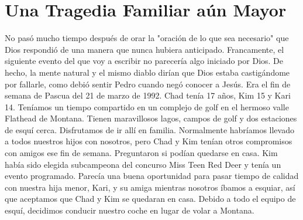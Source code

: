 \documentclass[twoside, 12pt]{book}
\begin{document}
 



\section{Una Tragedia Familiar aún Mayor}

No pasó mucho tiempo después de orar la "oración de lo que sea necesario" que Dios respondió de una manera que nunca hubiera anticipado. Francamente, el siguiente evento del que voy a escribir no parecería algo iniciado por Dios. De hecho, la mente natural y el mismo diablo dirían que Dios estaba castigándome por fallarle, como debió sentir Pedro cuando negó conocer a Jesús. Era el fin de semana de Pascua del 21 de marzo de 1992. Chad tenía 17 años, Kim 15 y Kari 14. Teníamos un tiempo compartido en un complejo de golf en el hermoso valle Flathead de Montana. Tienen maravillosos lagos, campos de golf y dos estaciones de esquí cerca. Disfrutamos de ir allí en familia. Normalmente habríamos llevado a todos nuestros hijos con nosotros, pero Chad y Kim tenían otros compromisos con amigos ese fin de semana. Preguntaron si podían quedarse en casa. Kim había sido elegida subcampeona del concurso Miss Teen Red Deer y tenía un evento programado. Parecía una buena oportunidad para pasar tiempo de calidad con nuestra hija menor, Kari, y su amiga mientras nosotros íbamos a esquiar, así que aceptamos que Chad y Kim se quedaran en casa. Debido a todo el equipo de esquí, decidimos conducir nuestro coche en lugar de volar a Montana.\\
\end{document}
